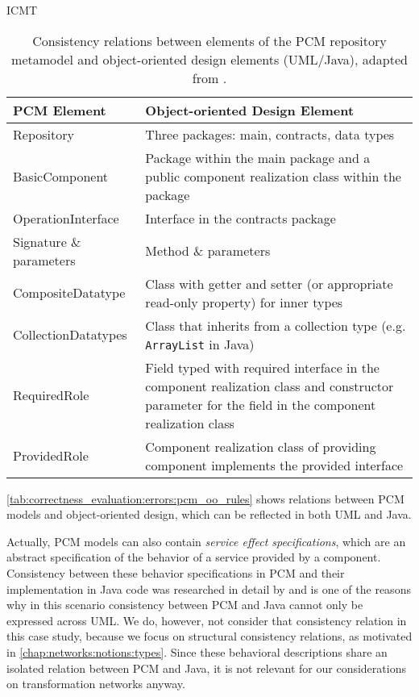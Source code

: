 \begin{copiedFrom}{ICMT}
\begin{table}
	\centering 
    \small
    \renewcommand{\arraystretch}{1.4}
	\begin{tabular}{p{3.2cm} p{6.6cm}}
		\toprule
        \textbf{\gls{PCM} Element}  & \textbf{Object-oriented Design Element} \\
        \midrule
		Repository            & Three packages: main, contracts, data types\\
		BasicComponent 		& Package within the main package and a public component realization class within the package \\
		OperationInterface		   	    & Interface in the contracts package \\
		Signature \& parameters & Method \& parameters \\
		CompositeDatatype     & Class with getter and setter (or appropriate read-only property) for inner types\\
		CollectionDatatypes   & Class that inherits from a collection type (e.g. \texttt{ArrayList} in Java) \\
		RequiredRole		    & Field typed with required interface in the component realization class and constructor parameter for the field in the component realization class\\
		ProvidedRole		    & Component realization class of providing component implements the provided interface\\
		\bottomrule
	\end{tabular}
	\caption[Consistency relation between PCM and UML/Java]{Consistency relations between elements of the \gls{PCM} repository metamodel and object-oriented design elements (\gls{UML}/Java), adapted from \cite[Table 4.1]{langhammer2017a}.}
	\label{tab:correctness_evaluation:errors:pcm_oo_rules}
\end{table}

\autoref{tab:correctness_evaluation:errors:pcm_oo_rules} shows relations between \gls{PCM} models and object-oriented design, which can be reflected in both \gls{UML} and Java.

Actually, \gls{PCM} models can also contain \emph{service effect specifications}, which are an abstract specification of the behavior of a service provided by a component.
Consistency between these behavior specifications in \gls{PCM} and their implementation in Java code was researched in detail by \textcite{langhammer2017a} and is one of the reasons why in this scenario consistency between \gls{PCM} and Java cannot only be expressed across \gls{UML}.
We do, however, not consider that consistency relation in this case study, because we focus on structural consistency relations, as motivated in \autoref{chap:networks:notions:types}.
Since these behavioral descriptions share an isolated relation between \gls{PCM} and Java, it is not relevant for our considerations on transformation networks anyway.


\end{copiedFrom}
